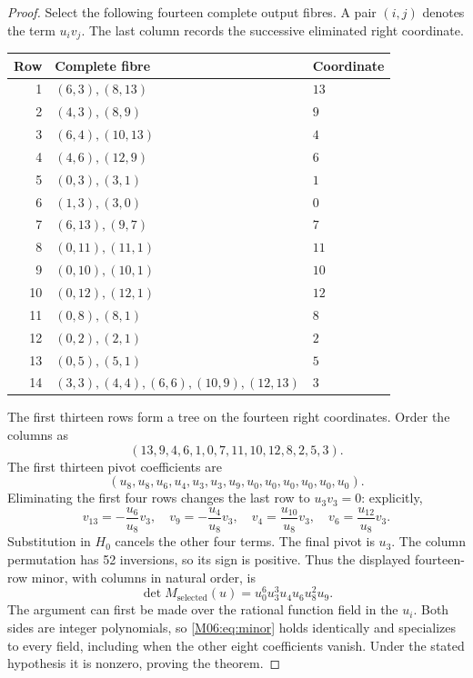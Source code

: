 \documentclass[11pt,a4paper,oneside]{report}
\theoremstyle{definition}
\theoremstyle{remark}
\begin{document}
\begin{proof}
Select the following fourteen complete output fibres. A pair
$(i,j)$ denotes the term $u_i v_j$. The last column records
the successive eliminated right coordinate.
\begin{center}
\small
\begin{tabular}{rll}
\toprule
Row&Complete fibre&Coordinate\\
\midrule
1&$(6,3),(8,13)$&$13$\\
2&$(4,3),(8,9)$&$9$\\
3&$(6,4),(10,13)$&$4$\\
4&$(4,6),(12,9)$&$6$\\
5&$(0,3),(3,1)$&$1$\\
6&$(1,3),(3,0)$&$0$\\
7&$(6,13),(9,7)$&$7$\\
8&$(0,11),(11,1)$&$11$\\
9&$(0,10),(10,1)$&$10$\\
10&$(0,12),(12,1)$&$12$\\
11&$(0,8),(8,1)$&$8$\\
12&$(0,2),(2,1)$&$2$\\
13&$(0,5),(5,1)$&$5$\\
14&$(3,3),(4,4),(6,6),(10,9),(12,13)$&$3$\\
\bottomrule
\end{tabular}
\end{center}
The first thirteen rows form a tree on the fourteen right
coordinates. Order the columns as
\[
(13,9,4,6,1,0,7,11,10,12,8,2,5,3).
\]
The first thirteen pivot coefficients are
\[
(u_8,u_8,u_6,u_4,u_3,u_3,u_9,u_0,u_0,u_0,u_0,u_0,u_0).
\]
Eliminating the first four rows changes the last row to
$u_3v_3=0$: explicitly,
\[
v_{13}=-\frac{u_6}{u_8}v_3,\quad
v_9=-\frac{u_4}{u_8}v_3,\quad
v_4=\frac{u_{10}}{u_8}v_3,\quad
v_6=\frac{u_{12}}{u_8}v_3.
\]
Substitution in $H_0$ cancels the other four terms.
The final pivot is $u_3$. The column permutation has 52
inversions, so its sign is positive. Thus the displayed
fourteen-row minor, with columns in natural order, is
\begin{equation}\label{M06:eq:minor}
\boxed{\det M_{\mathrm{selected}}(u)
=u_0^6u_3^3u_4u_6u_8^2u_9.}
\end{equation}
The argument can first be made over the rational function
field in the $u_i$. Both sides are integer polynomials, so
\eqref{M06:eq:minor} holds identically and specializes to every
field, including when the other eight coefficients vanish.
Under the stated hypothesis it is nonzero, proving the theorem.
\end{proof}
\end{document}
